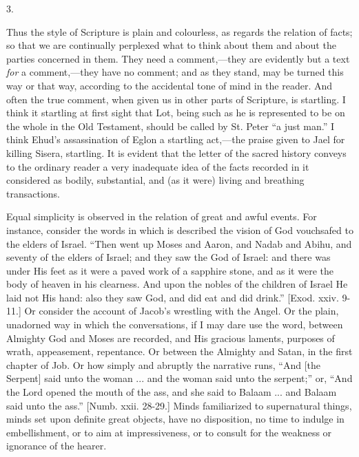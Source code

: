 3.

Thus the style of Scripture is plain and colourless, as regards the
relation of facts; so that we are continually perplexed what to think
about them and about the parties concerned in them. They need a
comment,—they are evidently but a text \emph{for} a comment,—they
have no comment; and as they stand, may be turned this way or that
way, according to the accidental tone of mind in the reader. And often
the true comment, when given us in other parts of Scripture, is
startling. I think it startling at first sight that Lot, being such as
he is represented to be on the whole in the Old Testament, should be
called by St. Peter ``a just man.'' I think Ehud's
assassination of Eglon a startling act,—the praise given to Jael for
killing Sisera, startling. It is evident that the letter of the sacred
history conveys to the ordinary reader a very inadequate idea of
the facts recorded in it considered as bodily, substantial, and (as it
were) living and breathing transactions.

Equal simplicity is observed in the relation of great and awful
events. For instance, consider the words in which is described the
vision of God vouchsafed to the elders of Israel. ``Then went up
Moses and Aaron, and Nadab and Abihu, and seventy of the elders of
Israel; and they saw the God of Israel: and there was under His feet
as it were a paved work of a sapphire stone, and as it were the body
of heaven in his clearness. And upon the nobles of the children of
Israel He laid not His hand: also they saw God, and did eat and did
drink.'' [Exod. xxiv. 9-11.] Or consider the account of Jacob's
wrestling with the Angel. Or the plain, unadorned way in which the
conversations, if I may dare use the word, between Almighty God and
Moses are recorded, and His gracious laments, purposes of wrath,
appeasement, repentance. Or between the Almighty and Satan, in the
first chapter of Job. Or how simply and abruptly the narrative runs,
``And [the Serpent] said unto the woman ... and the woman said
unto the serpent;'' or, ``And the Lord opened the mouth of the
ass, and she said to Balaam ... and Balaam said unto the ass.''
[Numb. xxii. 28-29.] Minds familiarized to supernatural things, minds
set upon definite great objects, have no disposition, no time to
indulge in embellishment, or to aim at impressiveness, or to consult
for the weakness or ignorance of the hearer.

